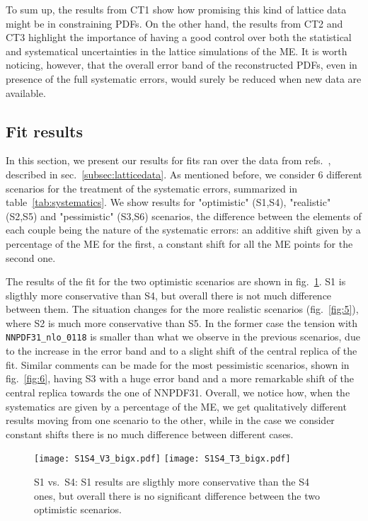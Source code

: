 To sum up, the results from CT1 show how promising this kind of lattice data
might be in constraining PDFs. On the other hand, the results from CT2 and CT3
highlight the importance of having a good control over both the statistical and
systematical uncertainties in the lattice simulations of the ME. It is worth
noticing, however, that the overall error band of the reconstructed PDFs, even in
presence of the full systematic errors, would surely be reduced when new data
are available.
 

\subsection{Fit results}
\label{subsec:fits}
In this section, we present our results for fits ran over the data from
refs.~\cite{Alexandrou:2018pbm,Alexandrou:2019lfo}, described in sec.~\ref{subsec:latticedata}. As
mentioned before, we consider 6 different scenarios for the treatment of the
systematic errors, summarized in table~\ref{tab:systematics}. We show results
for "optimistic" (S1,S4), "realistic" (S2,S5) and "pessimistic" (S3,S6)
scenarios, the difference between the elements of each couple being the nature
of the systematic errors: an additive shift given by a percentage of the ME for
the first, a constant shift for all the ME points for the second one. 

The results of the fit for the two optimistic scenarios are shown in
fig.~\ref{fig:4}. S1 is sligthly more conservative than S4, but overall there is
not much difference between them. The situation changes for the more realistic
scenarios (fig.~\ref{fig:5}), where S2 is much more conservative than S5. In the
former case the tension with {\tt NNPDF31\_nlo\_0118} is smaller than what we
observe in the previous scenarios, due to the increase in the error band and to
a slight shift of the central replica of the fit. Similar comments can be made
for the most pessimistic scenarios, shown in fig.~\ref{fig:6}, having S3 with a
huge error band and a more remarkable shift of the central replica towards the
one of NNPDF31. Overall, we notice how, when the systematics are given by a
percentage of the ME, we get qualitatively different results moving from one
scenario to the other, while in the case we consider constant shifts there is no
much difference between different cases. 
 
\begin{figure}[h]
    \begin{center}
	\texttt{[image: S1S4\_V3\_bigx.pdf]}  
	\texttt{[image: S1S4\_T3\_bigx.pdf]}  
	\caption{S1 vs.\ S4: S1 results are sligthly more conservative than the S4
	ones, but overall there is no significant difference between the two optimistic
	scenarios.}
    \label{fig:4}
    \end{center}
\end{figure}

